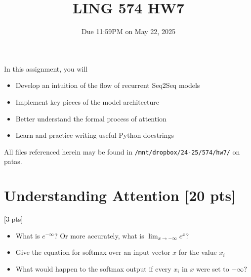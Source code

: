 \documentclass[11pt]{article}
\begin{document}
\title{LING 574 HW7}
\date{\vspace{-0.2in}Due 11:59PM on May 22, 2025}
\maketitle


\noindent In this assignment, you will 
\begin{itemize}
  \item Develop an intuition of the flow of recurrent Seq2Seq models
  \item Implement key pieces of the model architecture
  \item Better understand the formal process of attention
  \item Learn and practice writing useful Python docstrings
\end{itemize}
All files referenced herein may be found in \texttt{/mnt/dropbox/24-25/574/hw7/} on patas.


\section{Understanding Attention [20 pts]}

 \hfill [3 pts]
\begin{itemize}
  \item What is $e^{-\infty}$? Or more accurately, what is $\lim_{x \to -\infty} e^x$?
  \item Give the equation for softmax over an input vector $x$ for the value $x_i$
  \item What would happen to the softmax output if every $x_i$ in $x$ were set to $-\infty$?
\end{itemize}
\end{document}
